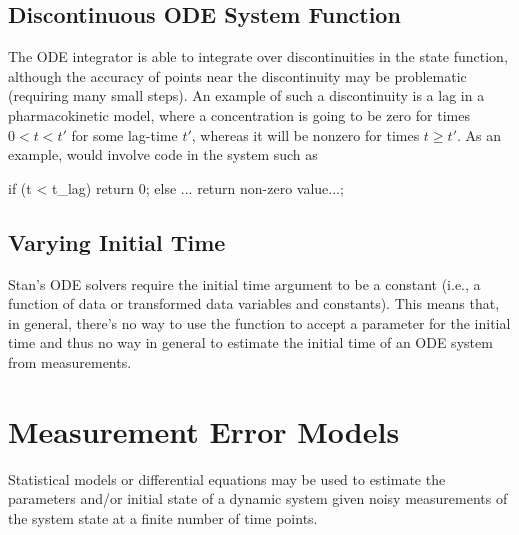 \subsection{Discontinuous ODE System Function}

The ODE integrator is able to integrate over discontinuities in the
state function, although the accuracy of points near the discontinuity
may be problematic (requiring many small steps).  An example of such a
discontinuity is a lag in a pharmacokinetic model, where a
concentration is going to be zero for times $0 < t < t'$ for some
lag-time $t'$, whereas it will be nonzero for times $t \geq t'$.  As
an example, would involve code in the system such as
%
\begin{stancode}
if (t < t_lag)
  return 0;
else
  ... return non-zero value...;
\end{stancode}


\subsection{Varying Initial Time}

Stan's ODE solvers require the initial time argument to be a constant
(i.e., a function of data or transformed data variables and
constants).  This means that, in general, there's no way to use the
 function to accept a parameter for the initial
time and thus no way in general to estimate the initial time of an ODE
system from measurements.
  

\section{Measurement Error Models}

Statistical models or differential equations may be used to estimate
the parameters and/or initial state of a dynamic system given noisy
measurements of the system state at a finite number of time points.

